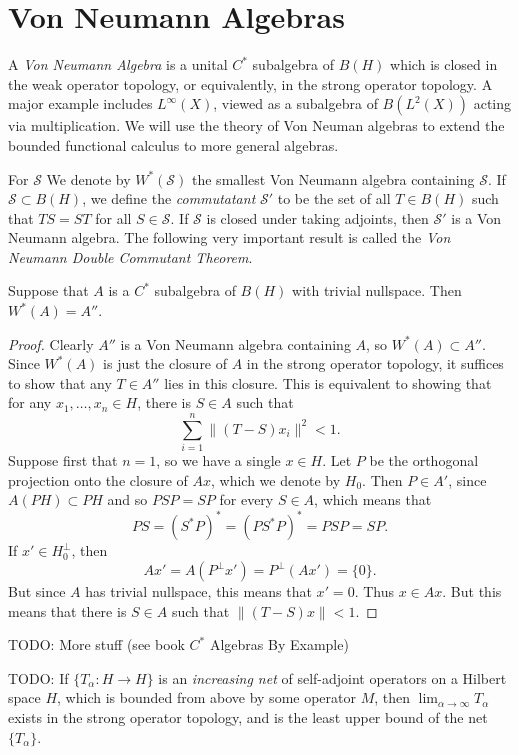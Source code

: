 \section{Von Neumann Algebras}

A \emph{Von Neumann Algebra} is a unital $C^*$ subalgebra of $B(H)$ which is closed in the weak operator topology, or equivalently, in the strong operator topology. A major example includes $L^\infty(X)$, viewed as a subalgebra of $B(L^2(X))$ acting via multiplication. We will use the theory of Von Neuman algebras to extend the bounded functional calculus to more general algebras.

For $\mathcal{S}$ We denote by $W^*(\mathcal{S})$ the smallest Von Neumann algebra containing $\mathcal{S}$. If $\mathcal{S} \subset B(H)$, we define the \emph{commutatant} $\mathcal{S}'$ to be the set of all $T \in B(H)$ such that $TS = ST$ for all $S \in \mathcal{S}$. If $\mathcal{S}$ is closed under taking adjoints, then $\mathcal{S}'$ is a Von Neumann algebra. The following very important result is called the \emph{Von Neumann Double Commutant Theorem}.

\begin{theorem}
    Suppose that $A$ is a $C^*$ subalgebra of $B(H)$ with trivial nullspace. Then $W^*(A) = A''$.
\end{theorem}
\begin{proof}
    Clearly $A''$ is a Von Neumann algebra containing $A$, so $W^*(A) \subset A''$. Since $W^*(A)$ is just the closure of $A$ in the strong operator topology, it suffices to show that any $T \in A''$ lies in this closure. This is equivalent to showing that for any $x_1,\dots,x_n \in H$, there is $S \in A$ such that
    \[ \sum_{i = 1}^n \| (T - S) x_i \|^2 < 1. \]
    Suppose first that $n = 1$, so we have a single $x \in H$. Let $P$ be the orthogonal projection onto the closure of $Ax$, which we denote by $H_0$. Then $P \in A'$, since $A(PH) \subset PH$ and so $PSP = SP$ for every $S \in A$, which means that
    \[ PS = (S^* P)^* = (PS^*P)^* = PSP = SP. \]
    If $x' \in H_0^\perp$, then
    \[ Ax' = A(P^\perp x') = P^\perp(Ax') = \{ 0 \}. \]
    But since $A$ has trivial nullspace, this means that $x' = 0$. Thus $x \in Ax$. But this means that there is $S \in A$ such that $\| (T - S) x \| < 1$.


\end{proof}

TODO: More stuff (see book $C^*$ Algebras By Example)

TODO: If $\{ T_\alpha: H \to H \}$ is an \emph{increasing net} of self-adjoint operators on a Hilbert space $H$, which is bounded from above by some operator $M$, then $\lim_{\alpha \to \infty} T_\alpha$ exists in the strong operator topology, and is the least upper bound of the net $\{ T_\alpha \}$.







